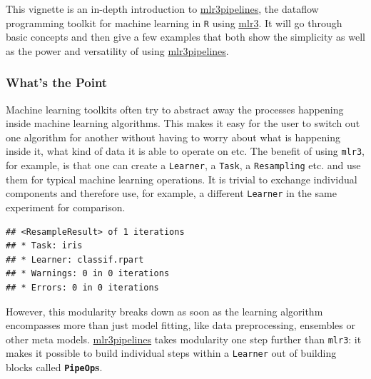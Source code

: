 \documentclass[]{article}
\newenvironment{Shaded}{\begin{snugshade}}{\end{snugshade}}
\newcommand{\KeywordTok}[1]{\textcolor[rgb]{0.13,0.29,0.53}{\textbf{#1}}}
\newcommand{\NormalTok}[1]{#1}
\newcommand{\OperatorTok}[1]{\textcolor[rgb]{0.81,0.36,0.00}{\textbf{#1}}}
\newcommand{\StringTok}[1]{\textcolor[rgb]{0.31,0.60,0.02}{#1}}
\renewenvironment{Shaded} {\begin{snugshade}\small} {\end{snugshade}}
\begin{document}
This vignette is an in-depth introduction to \href{https://cran.r-project.org/package=mlr3pipelines}{mlr3pipelines}, the dataflow programming toolkit for machine learning in \texttt{R} using \href{https://mlr3.mlr-org.com}{mlr3}.
It will go through basic concepts and then give a few examples that both show the simplicity as well as the power and versatility of using \href{https://cran.r-project.org/package=mlr3pipelines}{mlr3pipelines}.

\hypertarget{whats-the-point}{%
\subsubsection{What's the Point}\label{whats-the-point}}

Machine learning toolkits often try to abstract away the processes happening inside machine learning algorithms.
This makes it easy for the user to switch out one algorithm for another without having to worry about what is happening inside it, what kind of data it is able to operate on etc.
The benefit of using \texttt{mlr3}, for example, is that one can create a \texttt{Learner}, a \texttt{Task}, a \texttt{Resampling} etc. and use them for typical machine learning operations.
It is trivial to exchange individual components and therefore use, for example, a different \texttt{Learner} in the same experiment for comparison.

\begin{Shaded}
\end{Shaded}

\begin{verbatim}
## <ResampleResult> of 1 iterations
## * Task: iris
## * Learner: classif.rpart
## * Warnings: 0 in 0 iterations
## * Errors: 0 in 0 iterations
\end{verbatim}

However, this modularity breaks down as soon as the learning algorithm encompasses more than just model fitting, like data preprocessing, ensembles or other meta models.
\href{https://cran.r-project.org/package=mlr3pipelines}{mlr3pipelines} takes modularity one step further than \texttt{mlr3}: it makes it possible to build individual steps within a \texttt{Learner} out of building blocks called \textbf{\texttt{PipeOp}s}.
\end{document}
